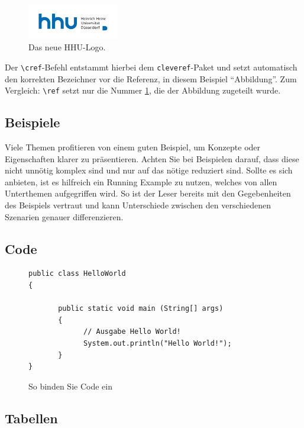 \documentclass{hhuarticle}
\begin{document}
  \begin{figure}[h]
    \centering
    \includegraphics[width=4cm]{fig/hhulogo.pdf}
    \caption{Das neue HHU-Logo.}%
    \label{fig:initial-draft}
  \end{figure}

  Der \texttt{\textbackslash cref}-Befehl entstammt hierbei dem
  \texttt{cleveref}-Paket und setzt automatisch den korrekten Bezeichner
  vor die Referenz, in diesem Beispiel ``Abbildung''.
  Zum Vergleich: \texttt{\textbackslash ref} setzt nur die
  Nummer \ref{fig:initial-draft}, die der Abbildung zugeteilt wurde.

  \subsection{Beispiele}
  Viele Themen profitieren von einem guten Beispiel,
  um Konzepte oder Eigenschaften klarer zu präsentieren.
  Achten Sie bei Beispielen darauf,
  dass diese nicht unnötig komplex sind und nur auf das nötige reduziert sind.
  Sollte es sich anbieten, ist es hilfreich ein Running Example zu nutzen,
  welches von allen Unterthemen aufgegriffen wird.
  So ist der Leser bereits mit den Gegebenheiten des Beispiels vertraut
  und kann Unterschiede zwischen den verschiedenen Szenarien genauer
  differenzieren.


  \subsection{Code}

  \begin{figure}[h]

\begin{lstlisting}
public class HelloWorld 
{
 
       public static void main (String[] args)
       {
             // Ausgabe Hello World!
             System.out.println("Hello World!");
       }
}
\end{lstlisting}
 \caption{So binden Sie Code ein}%
  \label{fig:codeBlock}
\end{figure}

  \subsection{Tabellen}
\end{document}
